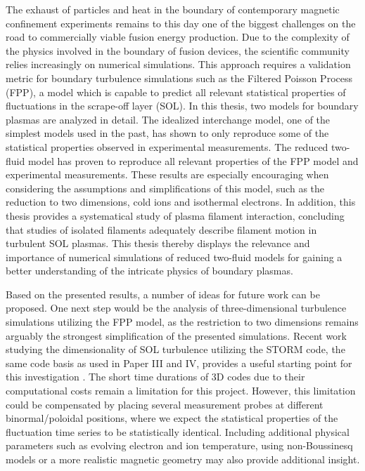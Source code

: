 The exhaust of particles and heat in the boundary of contemporary magnetic confinement
experiments remains to this day one of the biggest challenges on the road to
commercially viable fusion energy production. Due to the complexity of the physics
involved in the boundary of fusion devices, the scientific community relies increasingly
on numerical simulations. This approach requires a validation metric for boundary
turbulence simulations such as the Filtered Poisson Process (FPP), a model which is
capable to predict all relevant statistical properties of fluctuations in the scrape-off
layer (SOL). In this thesis, two models for boundary plasmas are analyzed in detail. The
idealized interchange model, one of the simplest models used in the past, has shown to
only reproduce some of the statistical properties observed in experimental measurements.
The reduced two-fluid model has proven to reproduce all relevant properties of the FPP
model and experimental measurements. These results are especially encouraging when
considering the assumptions and simplifications of this model, such as the reduction to
two dimensions, cold ions and isothermal electrons. In addition, this thesis provides a
systematical study of plasma filament interaction, concluding that studies of isolated
filaments adequately describe filament motion in turbulent SOL plasmas. This thesis
thereby displays the relevance and importance of numerical simulations of reduced
two-fluid models for gaining a better understanding of the intricate physics of boundary
plasmas.

Based on the presented results, a number of ideas for future work can be proposed. One
next step would be the analysis of three-dimensional turbulence simulations utilizing
the FPP model, as the restriction to two dimensions remains arguably the strongest
simplification of the presented simulations. Recent work studying the dimensionality of
SOL turbulence utilizing the STORM code, the same code basis as used in Paper III and
IV, provides a useful starting point for this investigation
\cite{nicholas_dim,Nicholas2021comparing}. The short time durations of 3D codes due to
their computational costs remain a limitation for this project. However, this limitation
could be compensated by placing several measurement probes at different
binormal/poloidal positions, where we expect the statistical properties of the
fluctuation time series to be statistically identical. Including additional physical
parameters such as evolving electron and ion temperature, using non-Boussinesq models or
a more realistic magnetic geometry may also provide additional insight.

